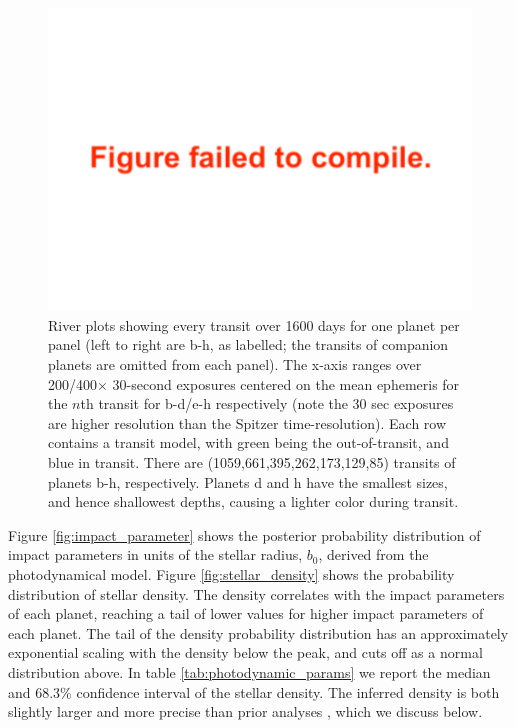 \documentclass[twocolumn]{aastex63}
\begin{document}
\begin{figure}
    \centering
    \includegraphics[width=\hsize]{figures/T1_riverplot.pdf}
    {River plots showing every transit over 1600 days for one planet per panel
        (left to right are b-h, as labelled; the
        transits of companion planets are omitted from each panel).
        The x-axis ranges over 200/400$\times$ 30-second exposures centered on the mean ephemeris for the $n$th transit
        for b-d/e-h respectively (note the 30 sec exposures are higher resolution than the Spitzer time-resolution).
        Each row contains a transit model, with green being the out-of-transit, and blue in
        transit.  There are (1059,661,395,262,173,129,85) transits of planets b-h, respectively.
        Planets d and h have the smallest sizes, and hence shallowest depths, causing a lighter
        color during transit.}
    \label{fig:riverplot}
\end{figure}

Figure \ref{fig:impact_parameter} shows the posterior probability distribution of impact
parameters in units of the stellar radius, $b_0$, derived from the photodynamical
model.  Figure \ref{fig:stellar_density} shows the probability distribution of stellar
density.  The density correlates with the impact
parameters of each planet, reaching a tail of lower values
for higher impact parameters of each planet.  The tail of the density probability
distribution has an approximately exponential scaling with the density below the
peak, and cuts off as a normal distribution above.  In table \ref{tab:photodynamic_params}
we report the median and 68.3\% confidence interval
of the stellar density.  The inferred density is both slightly larger and more precise
than prior analyses \citep{Delrez2018a}, which we discuss below.
\end{document}
